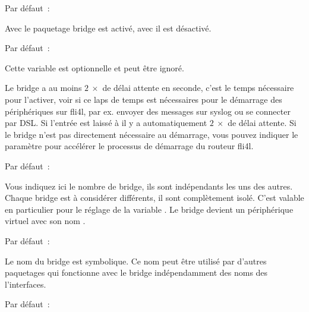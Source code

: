 \begin{description}


  Par défaut~: 

  Avec  le paquetage bridge est activé, avec  il est désactivé.


  Par défaut~: 

  Cette variable est optionnelle et peut être ignoré.

   Le bridge a au moins $2\ \times$  de délai
   attente en seconde, c'est le temps nécessaire pour l'activer, voir si ce laps
   de temps est nécessaires pour le démarrage des périphériques sur fli4l, par ex.
   envoyer des messages sur syslog ou se connecter par DSL. Si l'entrée est laissé à 
   il y a automatiquement $2\ \times$  de délai
   attente. Si le bridge n'est pas directement nécessaire au démarrage, vous pouvez
   indiquer le paramètre  pour accélérer le processus de démarrage du
   routeur fli4l.



  Par défaut~: 

  Vous indiquez ici le nombre de bridge, ils sont indépendants les uns des autres.
  Chaque bridge est à considérer différents, il sont complètement isolé. C'est
  valable en particulier pour le réglage de la variable .
  Le bridge devient un périphérique virtuel avec son nom .


  Par défaut~: 

  Le nom du bridge est symbolique. Ce nom peut être utilisé par d'autres paquetages
  qui fonctionne avec le bridge indépendamment des noms des l'interfaces.


  Par défaut~: 


\end{description}
